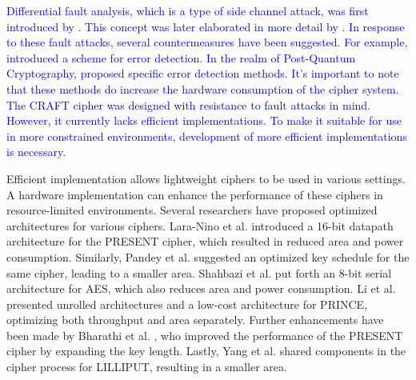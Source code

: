 \documentclass[final,5p,times,twocolumn]{elsarticle}
\begin{document}
\textcolor{blue}{Differential fault analysis, which is a type of side channel attack, was first introduced by \cite{Biham1997}. This concept was later elaborated in more detail by \cite{Kermani}. In response to these fault attacks, several countermeasures have been suggested. For example, \cite{Kaur2024} introduced a scheme for error detection. In the realm of Post-Quantum Cryptography, \cite{Canto2023} proposed specific error detection methods. It's important to note that these methods do increase the hardware consumption of the cipher system. The CRAFT cipher was designed with resistance to fault attacks in mind. However, it currently lacks efficient implementations. To make it suitable for use in more constrained environments, development of more efficient implementations is necessary.}

Efficient implementation allows lightweight ciphers to be used in various settings.
A hardware implementation can enhance the performance of these ciphers in resource-limited environments.
Several researchers have proposed optimized architectures for various ciphers.
Lara-Nino et al. \cite{LaraNino2017} introduced a 16-bit datapath architecture for the PRESENT cipher, which resulted in reduced area and power consumption.
Similarly, Pandey et al. \cite{Pandey2019} suggested an optimized key schedule for the same cipher, leading to a smaller area.
Shahbazi et al. \cite{Shahbazi2021} put forth an 8-bit serial architecture for AES, which also reduces area and power consumption.
Li et al. \cite{Li2021} presented unrolled architectures and a low-cost architecture for PRINCE, optimizing both throughput and area separately.
Further enhancements have been made by Bharathi et al. \cite{Bharathi2022}, who improved the performance of the PRESENT cipher by expanding the key length.
Lastly, Yang et al. \cite{Yang2023} shared components in the cipher process for LILLIPUT, resulting in a smaller area.
\end{document}
